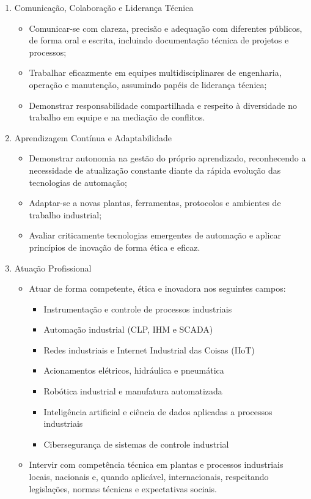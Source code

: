 \begin{enumerate}
\item Comunicação, Colaboração e Liderança Técnica

\begin{itemize}
    \item Comunicar-se com clareza, precisão e adequação com diferentes públicos, de forma oral e escrita, incluindo documentação técnica de projetos e processos;
    \item Trabalhar eficazmente em equipes multidisciplinares de engenharia, operação e manutenção, assumindo papéis de liderança técnica;
    \item Demonstrar responsabilidade compartilhada e respeito à diversidade no trabalho em equipe e na mediação de conflitos.
\end{itemize}

\item Aprendizagem Contínua e Adaptabilidade

\begin{itemize}
    \item Demonstrar autonomia na gestão do próprio aprendizado, reconhecendo a necessidade de atualização constante diante da rápida evolução das tecnologias de automação;
    \item Adaptar-se a novas plantas, ferramentas, protocolos e ambientes de trabalho industrial;
    \item Avaliar criticamente tecnologias emergentes de automação e aplicar princípios de inovação de forma ética e eficaz.
\end{itemize}

\item Atuação Profissional

\begin{itemize}
    \item Atuar de forma competente, ética e inovadora nos seguintes campos:

    \begin{itemize}
        \item Instrumentação e controle de processos industriais
        \item Automação industrial (CLP, IHM e SCADA)
        \item Redes industriais e Internet Industrial das Coisas (IIoT)
        \item Acionamentos elétricos, hidráulica e pneumática
        \item Robótica industrial e manufatura automatizada
        \item Inteligência artificial e ciência de dados aplicadas a processos industriais
        \item Cibersegurança de sistemas de controle industrial
    \end{itemize}

    \item Intervir com competência técnica em plantas e processos industriais locais, nacionais e, quando aplicável, internacionais, respeitando legislações, normas técnicas e expectativas sociais.
\end{itemize}
\end{enumerate}

